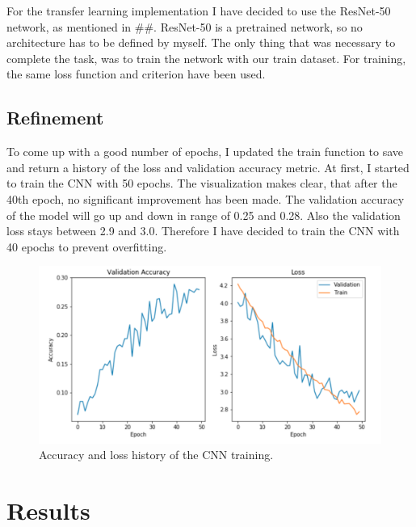 \documentclass{article}
\begin{document}
For the transfer learning implementation I have decided to use the ResNet-50 network, as mentioned in ##. ResNet-50 is a pretrained network, so no architecture has to be defined by myself. The only thing that was necessary to complete the task, was to train the network with our train dataset. For training, the same loss function and criterion have been used.

\subsection{Refinement}

To come up with a good number of epochs, I updated the train function to save and return a history of the loss and validation accuracy metric. At first, I started to train the CNN with 50 epochs. The visualization makes clear, that after the 40th epoch, no significant improvement has been made. The validation accuracy of the model will go up and down in range of 0.25 and 0.28. Also the validation loss stays between 2.9 and 3.0. Therefore I have decided to train the CNN with 40 epochs to prevent overfitting.
\begin{figure}[h]
    \centering
    \includegraphics[scale=0.45]{./images/50_epochs}
    \caption{Accuracy and loss history of the CNN training.}
    \label{fig:cnn_train_metrics}
\end{figure}

\section{Results} \label{s_results}
\end{document}

